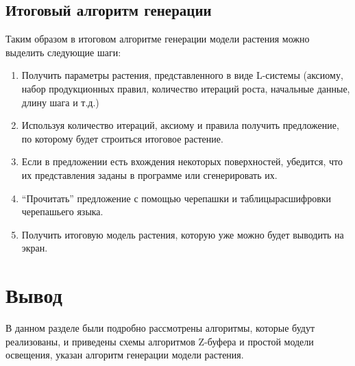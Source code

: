 \newpage

\subsection{Итоговый алгоритм генерации}

Таким образом в итоговом алгоритме генерации модели растения можно выделить следующие шаги:
\begin{enumerate}
    \item Получить параметры растения, представленного в виде L-системы (аксиому, набор продукционных правил, количество итераций роста, начальные данные, длину шага и т.д.)
    \item Используя количество итераций, аксиому и правила получить
предложение, по которому будет строиться итоговое растение.
    \item Если в предложении есть вхождения некоторых поверхностей, убедится, что их представления заданы в программе или сгенерировать их.
    \item “Прочитать” предложение с помощью черепашки и таблицырасшифровки черепашьего языка.
    \item Получить итоговую модель растения, которую уже можно будет
выводить на экран.
\end{enumerate}

\section*{Вывод}
В данном разделе были подробно рассмотрены алгоритмы, которые будут реализованы, и приведены схемы алгоритмов Z-буфера и простой модели освещения, указан алгоритм генерации модели растения.
